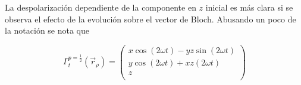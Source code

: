 La despolarización dependiente de la componente en $z$ inicial es más clara si se observa el efecto de la evolución sobre el vector de Bloch. Abusando un poco de la notación se nota que 

\begin{equation*}
    \Gamma_{t}^{p=\frac{1}{2}}(\vec{r}_{\rho})=\begin{pmatrix}
        x\cos(2\omega t)-yz\sin(2\omega t)\\
        y\cos(2\omega t)+xz(2\omega t)\\
        z\\
    \end{pmatrix}
\end{equation*}
